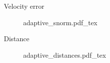 \begin{frame}{Velocity error}
    \begin{figure}[ht!]
        \centering
        \def\svgwidth{.9\linewidth}
        {\scriptsize{adaptive_snorm.pdf_tex}}
    \end{figure}
\end{frame}

\begin{frame}{Distance}
    \begin{figure}[ht!]
        \centering
        \def\svgwidth{.9\linewidth}
        {\scriptsize{adaptive_distances.pdf_tex}}
    \end{figure}
\end{frame}